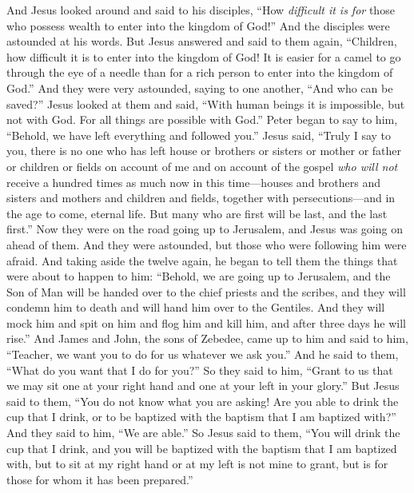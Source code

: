 \begin{biblechapter}
\verse And Jesus looked around and said to his disciples, “How \textit{difficult it is for} those who possess wealth to enter into the kingdom of God!”
\verse And the disciples were astounded at his words. But Jesus answered and said to them again, “Children, how difficult it is to enter into the kingdom of God!
\verse It is easier for a camel to go through the eye of a needle than for a rich person to enter into the kingdom of God.”
\verse And they were very astounded, saying to one another, “And who can be saved?”
\verse Jesus looked at them and said, “With human beings it is impossible, but not with God. For all things are possible with God.”
\verse Peter began to say to him, “Behold, we have left everything and followed you.”
\verse Jesus said, “Truly I say to you, there is no one who has left house or brothers or sisters or mother or father or children or fields on account of me and on account of the gospel
\verse \textit{who will not} receive a hundred times as much now in this time—houses and brothers and sisters and mothers and children and fields, together with persecutions—and in the age to come, eternal life.
\verse But many who are first will be last, and the last first.”
 Now they were on the road going up to Jerusalem, and Jesus was going on ahead of them. And they were astounded, but those who were following him were afraid. And taking aside the twelve again, he began to tell them the things that were about to happen to him:
\verse “Behold, we are going up to Jerusalem, and the Son of Man will be handed over to the chief priests and the scribes, and they will condemn him to death and will hand him over to the Gentiles.
\verse And they will mock him and spit on him and flog him and kill him, and after three days he will rise.”
 And James and John, the sons of Zebedee, came up to him and said to him, “Teacher, we want you to do for us whatever we ask you.”
\verse And he said to them, “What do you want that I do for you?”
\verse So they said to him, “Grant to us that we may sit one at your right hand and one at your left in your glory.”
\verse But Jesus said to them, “You do not know what you are asking! Are you able to drink the cup that I drink, or to be baptized with the baptism that I am baptized with?”
\verse And they said to him, “We are able.” So Jesus said to them, “You will drink the cup that I drink, and you will be baptized with the baptism that I am baptized with,
\verse but to sit at my right hand or at my left is not mine to grant, but is for those for whom it has been prepared.”

\end{biblechapter}
